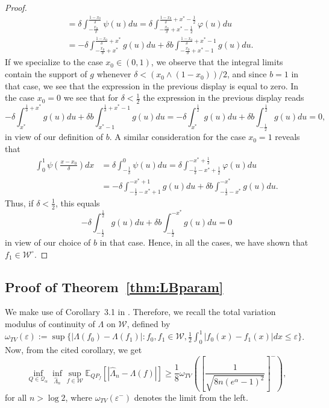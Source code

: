 \documentclass[preprint]{imsart}
\newcommand{\E}{{\mathbb E}}
\newcommand{\eps}{\varepsilon}
\numberwithin{equation}{section}
\begin{document}
\begin{appendix}
\begin{proof}
\begin{align*}
        &=\delta \int_{-\frac{x_0}{\delta}}^{\frac{1-x_0}{\delta}} \psi(u)du
        =\delta
        \int_{-\frac{x_0}{\delta}+x^*-\frac12}^{\frac{1-x_0}{\delta}+x^*-\frac12} \varphi(u)du\\
        &=
        -\delta \int_{-\frac{x_0}{\delta}+x^*}^{\frac{1-x_0}{\delta}+x^*}g(u)du + \delta b \int_{-\frac{x_0}{\delta}+x^*-1}^{\frac{1-x_0}{\delta}+x^*-1}g(u)du.
    \end{align*}
    If we specialize to the case $x_0\in(0,1)$, we observe that the integral limits contain the support of $g$ whenever $\delta<(x_0\land(1-x_0))/2$, and since $b=1$ in that case, we see that the expression in the previous display is equal to zero. In the case $x_0=0$ we see that for $\delta<\frac12$ the expression in the previous display reads
    $$
    -\delta \int_{x^*}^{\frac{1}{\delta}+x^*}g(u)du + \delta b \int_{x^*-1}^{\frac{1}{\delta}+x^*-1}g(u)du
    =
    -\delta \int_{x^*}^{\frac12}g(u)du + \delta b \int_{-\frac12}^{\frac12}g(u)du = 0,
    $$
    in view of our definition of $b$.
    A similar consideration for the case $x_0=1$ reveals that
    \begin{align*}
        \int_0^1 \psi\left( \frac{x-x_0}{\delta}\right)dx
        &=\delta \int_{-\frac{1}{\delta}}^{0} \psi(u)du
        =\delta
        \int_{-\frac{1}{\delta}-x^*+\frac12}^{-x^*+\frac12} \varphi(u)du\\
        &=
        -\delta \int_{-\frac{1}{\delta}-x^*+1}^{-x^*+1}g(u)du + \delta b \int_{-\frac{1}{\delta}-x^*}^{-x^*}g(u)du.
    \end{align*}
    Thus, if $\delta<\frac12$, this equals 
    $$
    -\delta \int_{-\frac12}^{\frac12}g(u)du + \delta b \int_{-\frac12}^{-x^*}g(u)du = 0
    $$
    in view of our choice of $b$ in that case.
    Hence, in all the cases, we have shown that $f_1\in\mathcal W^\circ$.
\end{proof}



\subsection{Proof of Theorem~\ref{thm:LBparam}}

We make use of Corollary~3.1 in \cite{Rohde20}. Therefore, we recall the total variation modulus of continuity of $\Lambda$ on $\mathcal W$, defined by $\omega_{TV}(\eps) := \sup\{|\Lambda(f_0) - \Lambda(f_1)| : f_0,f_1\in\mathcal W, \frac12\int_0^1 |f_0(x)-f_1(x)|dx\le \eps\}$. Now, from the cited corollary, we get
\begin{equation}\label{eq:RohdeSteinb}
\inf_{Q\in\mathcal Q_\alpha} \inf_{\hat{\Lambda}_n} \sup_{f\in\mathcal W} \E_{QP_f}\left[|\hat{\Lambda}_n - \Lambda(f)|\right]
\ge \frac18 \omega_{TV}\left(\left[\frac{1}{\sqrt{8n(e^\alpha-1)^2}}\right]^-\right),
\end{equation}
for all $n>\log 2$, where $\omega_{TV}(\eps^-)$ denotes the limit from the left.


\end{appendix}
\end{document}
